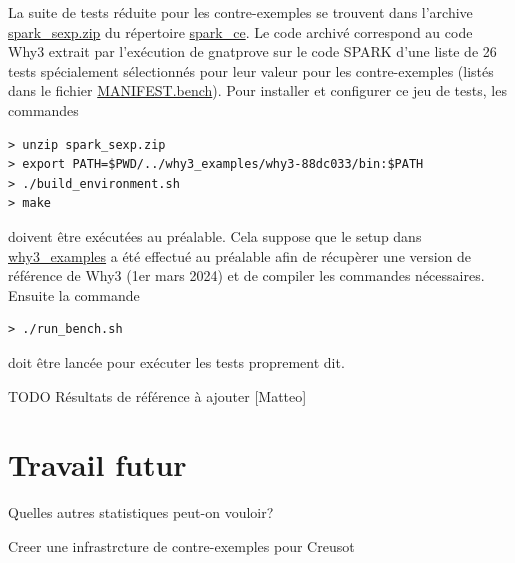 \documentclass[a4paper,11pt]{article}
\begin{document}
La suite de tests réduite pour les contre-exemples se trouvent dans l'archive
\url{spark_sexp.zip} du répertoire \url{spark_ce}.  Le code archivé correspond
au code Why3 extrait par l'exécution de gnatprove sur le code SPARK d'une liste de
26 tests spécialement sélectionnés pour leur valeur pour les contre-exemples
(listés dans le fichier \url{MANIFEST.bench}). Pour installer et configurer ce
jeu de tests, les commandes
\begin{lstlisting}
> unzip spark_sexp.zip
> export PATH=$PWD/../why3_examples/why3-88dc033/bin:$PATH
> ./build_environment.sh
> make
\end{lstlisting}
doivent être exécutées au préalable. Cela suppose que le setup dans \url{why3_examples}
a été effectué au préalable afin de récupèrer une version de
référence de Why3 (1er mars 2024) et de compiler les commandes nécessaires. Ensuite la commande
\begin{lstlisting}
> ./run_bench.sh
\end{lstlisting}
doit être lancée pour exécuter les tests proprement dit.

TODO Résultats de référence à ajouter [Matteo]

\section{Travail futur}

Quelles autres statistiques peut-on vouloir?

Creer une infrastrcture de contre-exemples pour Creusot

\clearpage



%
\end{document}
